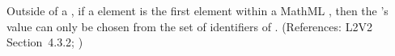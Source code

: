 Outside of a \FunctionDefinition, if a  element is the
first element within a MathML , then the 's
value can only be chosen from the set of identifiers of
.
(References: L2V2 Section~4.3.2; )
